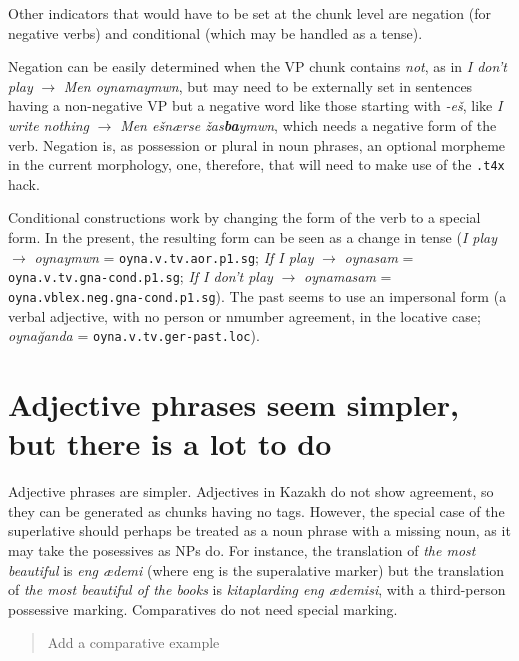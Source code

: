\documentclass{article}
\newcommand{\com}[1]{\begin{quote}\begin{sf}#1\end{sf}\end{quote}}
\begin{document}
Other indicators that would have to be set at the chunk level are negation (for negative verbs) and conditional (which may be handled as a tense). 

Negation can be easily determined when the VP chunk contains \emph{not}, as in \emph{I don't play} \(\to\) \emph{Men oynamaymwn}, but may need to be externally set in sentences having a non-negative VP but a negative word like those starting with \emph{-eš}, like \emph{I write nothing} \(\to\) \emph{Men ešnærse \v{z}as\textbf{ba}ymwn}, which needs a negative form of the verb. Negation is, as possession or plural in noun phrases, an optional morpheme in the current morphology, one, therefore, that will need to make use of the \texttt{.t4x} hack.

Conditional constructions work by changing the form of the verb to a special form. In the present, the resulting form can be seen as a change in tense (\emph{I play} \(\to\) \emph{oynaymwn} = \texttt{oyna.v.tv.aor.p1.sg}; \emph{If I play} \(\to\) \emph{oynasam} = \texttt{oyna.v.tv.gna-cond.p1.sg}; \emph{If I don't play} \(\to\) \emph{oynamasam} = \texttt{oyna.vblex.neg.gna-cond.p1.sg}). The past seems to use an impersonal form (a verbal adjective, with no person or nmumber agreement, in the locative case; \emph{oyna\u{g}anda} = \texttt{oyna.v.tv.ger-past.loc}).

\section{Adjective phrases seem simpler, but there is a lot to do}

Adjective phrases are simpler. Adjectives in Kazakh do not show agreement, so they can be generated as chunks having no tags. However, the special case of the superlative should perhaps be treated as a noun phrase with a missing noun, as it may take the posessives as NPs do. For instance, the translation of \emph{the most beautiful} is \emph{eng ædemi} (where eng is the superalative marker) but the translation of \emph{the most beautiful of the books} is \emph{kitaplarding eng ædemisi}, with a third-person possessive marking. Comparatives do not need special marking.
\com{Add a comparative example}
\end{document}
